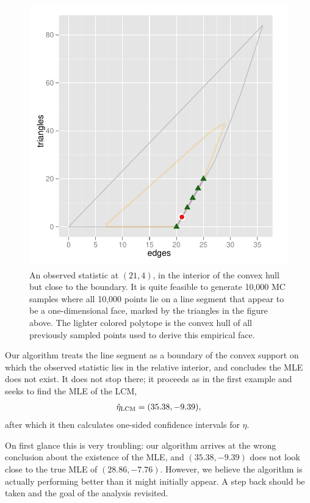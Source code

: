 \begin{figure}[!h]
\centering
\includegraphics[height=4.5in,width=4.5in]{Figures/MCsample-fakeface}
\caption{An observed statistic at $(21,4)$, in the interior of the convex hull but 
close to the boundary.  It is quite feasible to generate 10,000 MC 
samples where all 10,000 points lie on a line segment that appear to be 
a one-dimensional face, marked by the triangles in the figure above.  
The lighter colored polytope is the convex hull of all previously 
sampled points used to derive this empirical face.}
\label{F:MC problem}
\end{figure}

Our algorithm treats the line segment as a boundary of the 
convex support on which the observed statistic lies in the relative interior, and 
concludes the MLE does not exist.  It does not stop there; it proceeds as in the first
example and seeks to find the MLE of the LCM,
\begin{align*}
	\hat{\eta}_{\textrm{LCM}} = (35.38, -9.39),
\end{align*}
after which it then calculates one-sided confidence intervals for $\eta$.

On first glance this is very troubling: our algorithm arrives at the wrong conclusion 
about the existence of the MLE, and $(35.38, -9.39)$ does not look close 
to the true MLE of $(28.86, -7.76)$.  However, we believe the algorithm is
actually performing better than it might initially appear.
A step back should be taken and the goal of the analysis revisited.  


